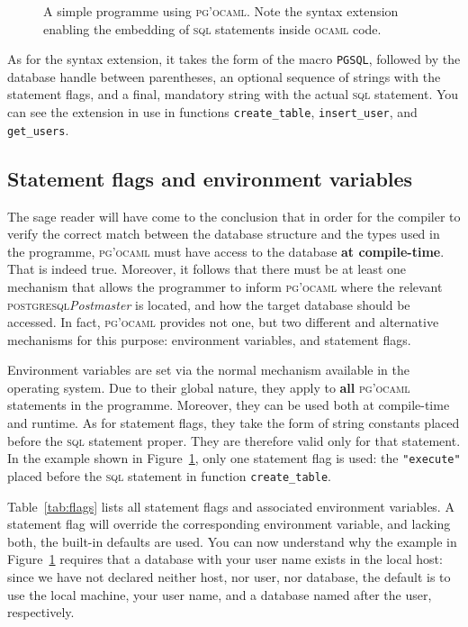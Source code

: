 \documentclass[11pt]{article}
\newcommand{\ocaml}{\textsc{ocaml}\xspace}
\newcommand{\postgresql}{\textsc{postgresql}\xspace}
\newcommand{\sql}{\textsc{sql}\xspace}
\newcommand{\pgocaml}{\textsc{pg'ocaml}\xspace}
\newcommand{\displaycodefile}[1]{\fcolorbox{codeframe}{codeback}{\BVerbatimInput[numbers=right,formatcom=\color{codefront},fontsize=\footnotesize]{#1}}}
\begin{document}
\begin{figure}[!ht]
\centering
\displaycodefile{examples/one/one.ml}
\caption{A simple programme using \pgocaml.  Note the syntax extension
enabling the embedding of \sql statements inside \ocaml code.}
\label{fig:one}
\end{figure}

As for the syntax extension, it takes the form of the macro \texttt{PGSQL}, followed
by the database handle between parentheses, an optional sequence of strings with the
statement flags, and a final, mandatory string with the actual \sql statement.  You can
see the extension in use in functions \texttt{create\_table}, \texttt{insert\_user},
and \texttt{get\_users}.



\subsection{Statement flags and environment variables}
\label{sec:flags}

The sage reader will have come to the conclusion that in order for the compiler to
verify the correct match between the database structure and the types used in the
programme, \pgocaml must have access to the database \textbf{at compile-time}.  That is
indeed true.  Moreover, it follows that there must be at least one mechanism that allows
the programmer to inform \pgocaml where the relevant \postgresql \emph{Postmaster} is
located, and how the target database should be accessed.  In fact, \pgocaml provides
not one, but two different and alternative mechanisms for this purpose: environment
variables, and statement flags.

Environment variables are set via the normal mechanism available in the operating
system.  Due to their global nature, they apply to \textbf{all} \pgocaml statements
in the programme.  Moreover, they can be used both at compile-time and runtime.
As for statement flags, they take the form of string constants placed before the \sql
statement proper.  They are therefore valid only for that statement. In the example
shown in Figure~\ref{fig:one}, only one statement flag is used: the \texttt{"execute"}
placed before the \sql statement in function \texttt{create\_table}.

Table~\ref{tab:flags} lists all statement flags and associated environment variables.
A statement flag will override the corresponding environment variable, and lacking
both, the built-in defaults are used.  You can now understand why the example in
Figure~\ref{fig:one} requires that a database with your user name exists in the local
host: since we have not declared neither host, nor user, nor database, the default is to
use the local machine, your user name, and a database named after the user, respectively.
\end{document}
